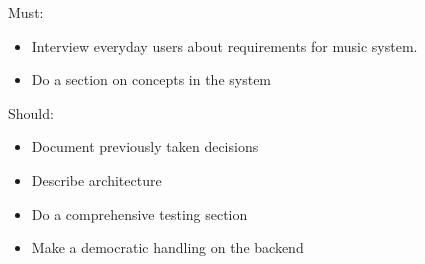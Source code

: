 	Must:
	\begin{itemize}
		\item Interview everyday users about requirements for music system.
		\item Do a section on concepts in the system
	\end{itemize}

	Should:
	\begin{itemize}
		\item Document previously taken decisions
		\item Describe architecture
		\item Do a comprehensive testing section
		\item Make a democratic handling on the backend
	\end{itemize}
